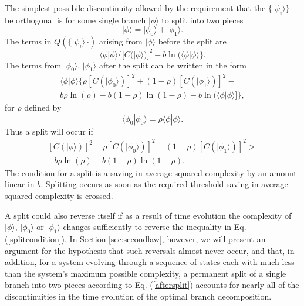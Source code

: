 \documentclass[12pt,amsmath,amssymb,onecolumn]{revtex4-2}
\begin{document}
The simplest possibile discontinuity allowed by the requirement that the
$\{ |\psi_i \rangle  \}$ be orthogonal is for some single branch $|\phi \rangle $ to split
into two pieces
\begin{equation}\label{splitphi}
|\phi \rangle  = |\phi_0 \rangle  + |\phi_1 \rangle .
\end{equation}
The terms in $Q( \{|\psi_i \rangle \})$ arising from $|\phi \rangle $ before
the split are
\begin{equation}\label{beforesplit}
 \langle \phi|\phi \rangle \{[C( |\phi \rangle )]^2 - b \ln(  \langle  \phi | \phi \rangle \}.
\end{equation}
The terms from $|\phi_0 \rangle $, $|\phi_1 \rangle $ after the split can be written in the form
\begin{multline}\label{aftersplit}
 \langle \phi|\phi \rangle \{ \rho [C( |\phi_0 \rangle )]^2 + ( 1 - \rho) [C( |\phi_1 \rangle )]^2 - \\
b \rho \ln( \rho) - b ( 1 - \rho) \ln( 1 - \rho)  - b \ln(  \langle  \phi| \phi \rangle ]\},
\end{multline}
for $\rho$ defined by
\begin{equation}
    \label{defofrho}
     \langle  \phi_0 | \phi_0 \rangle  = \rho  \langle  \phi | \phi \rangle .
\end{equation}
Thus a split will occur if
\begin{multline}\label{splitcondition}
[C( |\phi \rangle )]^2 - \rho [C( |\phi_0 \rangle )]^2 - ( 1 - \rho) [C( |\phi_1 \rangle )]^2 > \\
-b \rho \ln( \rho) - b ( 1 - \rho) \ln( 1 - \rho).
\end{multline}
The condition for a split is a saving in average squared complexity
by an amount linear in $b$. 
Splitting occurs as soon as the required threshold 
saving in average squared complexity is crossed.

A split could also reverse itself if as a result of time evolution
the complexity of $|\phi \rangle $, $|\phi_0 \rangle $ or $|\phi_1 \rangle $ changes sufficiently to
reverse the inequality in Eq. (\ref{splitcondition}). 
In Section \ref{sec:secondlaw}, however, we will
present an argument for the hypothesis
that such reversals almost never occur, and that,
in addition, for a system evolving through
a sequence of states each with much less than the
system's maximum possible complexity,
a permanent split
of a single branch into two pieces according to
Eq. (\ref{aftersplit})
accounts for nearly all of the discontinuities
in the time evolution of 
the optimal branch decomposition.
\end{document}
